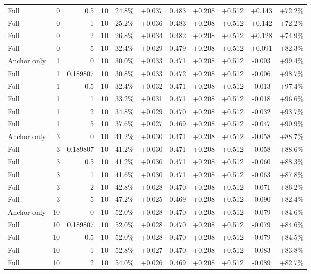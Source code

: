 \begin{table}[htbp]
\begin{tabular}{lrrrccccccc}
Full & 0 & 0.5 & 10 & 24.8\% & +0.037 & 0.483 & +0.208 & +0.512 & +0.143 & +72.2\% \\
Full & 0 & 1 & 10 & 25.2\% & +0.036 & 0.483 & +0.208 & +0.512 & +0.142 & +72.2\% \\
Full & 0 & 2 & 10 & 26.8\% & +0.034 & 0.482 & +0.208 & +0.512 & +0.128 & +74.9\% \\
Full & 0 & 5 & 10 & 32.4\% & +0.029 & 0.479 & +0.208 & +0.512 & +0.091 & +82.3\% \\
Anchor only & 1 & 0 & 10 & 30.0\% & +0.033 & 0.471 & +0.208 & +0.512 & -0.003 & +99.4\% \\
Full & 1 & 0.189807 & 10 & 30.8\% & +0.033 & 0.472 & +0.208 & +0.512 & -0.006 & +98.7\% \\
Full & 1 & 0.5 & 10 & 32.4\% & +0.032 & 0.471 & +0.208 & +0.512 & -0.013 & +97.4\% \\
Full & 1 & 1 & 10 & 33.2\% & +0.031 & 0.471 & +0.208 & +0.512 & -0.018 & +96.6\% \\
Full & 1 & 2 & 10 & 34.8\% & +0.029 & 0.470 & +0.208 & +0.512 & -0.032 & +93.7\% \\
Full & 1 & 5 & 10 & 37.6\% & +0.027 & 0.469 & +0.208 & +0.512 & -0.047 & +90.9\% \\
Anchor only & 3 & 0 & 10 & 41.2\% & +0.030 & 0.471 & +0.208 & +0.512 & -0.058 & +88.7\% \\
Full & 3 & 0.189807 & 10 & 41.2\% & +0.030 & 0.471 & +0.208 & +0.512 & -0.058 & +88.6\% \\
Full & 3 & 0.5 & 10 & 41.2\% & +0.030 & 0.471 & +0.208 & +0.512 & -0.060 & +88.3\% \\
Full & 3 & 1 & 10 & 41.6\% & +0.030 & 0.471 & +0.208 & +0.512 & -0.063 & +87.8\% \\
Full & 3 & 2 & 10 & 42.8\% & +0.028 & 0.470 & +0.208 & +0.512 & -0.071 & +86.2\% \\
Full & 3 & 5 & 10 & 47.2\% & +0.025 & 0.469 & +0.208 & +0.512 & -0.090 & +82.4\% \\
Anchor only & 10 & 0 & 10 & 52.0\% & +0.028 & 0.470 & +0.208 & +0.512 & -0.079 & +84.6\% \\
Full & 10 & 0.189807 & 10 & 52.0\% & +0.028 & 0.470 & +0.208 & +0.512 & -0.079 & +84.6\% \\
Full & 10 & 0.5 & 10 & 52.0\% & +0.028 & 0.470 & +0.208 & +0.512 & -0.079 & +84.5\% \\
Full & 10 & 1 & 10 & 52.8\% & +0.027 & 0.470 & +0.208 & +0.512 & -0.083 & +83.8\% \\
Full & 10 & 2 & 10 & 54.0\% & +0.026 & 0.469 & +0.208 & +0.512 & -0.089 & +82.7\% \\

\end{tabular}
\end{table}
